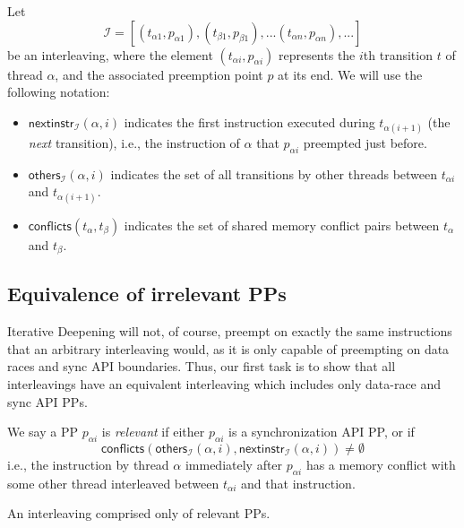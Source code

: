 \newcommand\ppinstr[3]{\ensuremath{\mathsf{nextinstr}_{#1}(#2,#3)}}
\newcommand\ppothers[3]{\ensuremath{\mathsf{others}_{#1}(#2,#3)}}
\newcommand\pppfx[2]{\ensuremath{\mathsf{pfx}(#1,#2)}}
\newcommand\conflicts[2]{\ensuremath{\mathsf{conflicts}(#1,#2)}}
\newcommand\pai{\ensuremath{p_{\alpha{}i}}}
\newcommand\tai{\ensuremath{t_{\alpha{}i}}}
Let
\[
	\mathcal{I} = [ (t_{\alpha{}1}, p_{\alpha{}1}), (t_{\beta{}1}, p_{\beta{}1}), ... (t_{\alpha{}n}, p_{\alpha{}n}), ... ]
\]
be an interleaving, where the element $(\tai, \pai)$ represents the $i$th transition $t$ of thread $\alpha$, and the associated preemption point $p$ at its end.
We will use the following notation:
\begin{itemize}
	\item $\ppinstr{\mathcal{I}}{\alpha}{i}$ indicates the first instruction executed during $t_{\alpha{}(i+1)}$ (the {\em next} transition),
		i.e., the instruction of $\alpha$ that $\pai$ preempted just before.
	\item $\ppothers{\mathcal{I}}{\alpha}{i}$ indicates the set of all transitions by other threads between $\tai$ and $t_{\alpha{}(i+1)}$.
	\item $\conflicts{t_\alpha}{t_\beta}$ indicates the set of shared memory conflict pairs between $t_\alpha$ and $t_\beta$.
\end{itemize}


\subsection{Equivalence of irrelevant PPs}

Iterative Deepening will not, of course, preempt on exactly the same instructions that an arbitrary \naive interleaving would,
as it is only capable of preempting on data races and sync API boundaries.
Thus, our first task is to show that all \naive interleavings have an equivalent interleaving which includes only data-race and sync API PPs.

\begin{definition}
	We say a PP $\pai$ is {\em relevant} if either
	$\pai$ is a synchronization API PP,
	or if
	\[
		\conflicts{\ppothers{\mathcal{I}}{\alpha}{i}}{\ppinstr{\mathcal{I}}{\alpha}{i}} \ne \emptyset
	\]
	i.e., the instruction by thread $\alpha$ immediately after $\pai$ has a memory conflict with some other thread interleaved between $\tai$ and that instruction.
\end{definition}
\begin{definition}
	An interleaving comprised only of relevant PPs.
\end{definition}

